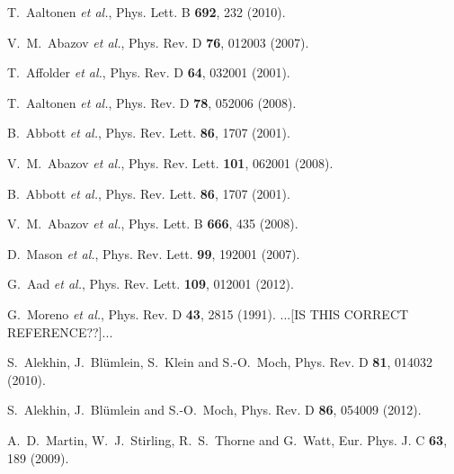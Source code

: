 \documentclass[aps,prd,amsmath,preprint]{revtex4}
\begin{document}
\begin{thebibliography}{99}
T.~Aaltonen {\it et al.}, 
Phys. Lett. B {\bf 692}, 232 (2010).

V.~M.~Abazov {\it et al.},
Phys. Rev. D {\bf 76}, 012003 (2007).

T.~Affolder {\it et al.},
Phys. Rev. D {\bf 64}, 032001 (2001).

T.~Aaltonen {\it et al.},
Phys. Rev. D {\bf 78}, 052006 (2008).

B.~Abbott {\it et al.},
Phys. Rev. Lett. {\bf 86}, 1707 (2001).

V.~M.~Abazov {\it et al.},
Phys. Rev. Lett. {\bf 101}, 062001 (2008). 

B.~Abbott {\it et al.},
Phys. Rev. Lett. {\bf 86}, 1707 (2001).

V.~M.~Abazov {\it et al.},
Phys. Lett. B {\bf 666}, 435 (2008).

D.~Mason {\it et al.},
Phys. Rev. Lett. {\bf 99}, 192001 (2007).

G.~Aad {\it et al.},
Phys. Rev. Lett. {\bf 109}, 012001 (2012).

%
%
%
%
%

G.~Moreno {\it et al.},  
Phys. Rev. D {\bf 43}, 2815 (1991).
{\color{red}...[IS THIS CORRECT REFERENCE??]...}

S.~Alekhin, J.~Bl\"umlein, S.~Klein and S.-O.~Moch,
Phys. Rev. D {\bf 81}, 014032 (2010).

S.~Alekhin, J.~Bl\"umlein and S.-O.~Moch,
Phys. Rev. D {\bf 86}, 054009 (2012).

A.~D.~Martin, W.~J.~Stirling, R.~S.~Thorne and G.~Watt,
Eur. Phys. J. C {\bf 63}, 189 (2009).


\end{thebibliography}
\end{document}
